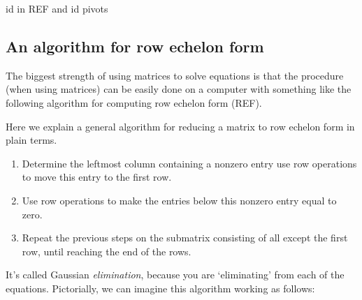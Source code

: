 \documentclass{ximera}
\begin{document}
\begin{question}
  id in REF and id pivots
\end{question}



\subsection{An algorithm for row echelon form}

The biggest strength of using matrices to solve equations is that the
procedure (when using matrices) can be easily done on a computer with
something like the following algorithm for computing row echelon form
(REF).

\begin{algorithm}
  Here we explain a general algorithm for reducing a matrix to row
  echelon form in plain terms.
  \begin{enumerate}
  \item Determine the leftmost column containing a nonzero entry use
    row operations to move this entry to the first row.
  \item Use row operations to make the entries below this nonzero entry equal to zero.
  \item Repeat the previous steps on the submatrix consisting of all
    except the first row, until reaching the end of the rows.
  \end{enumerate}
\end{algorithm}

It's called Gaussian \textit{elimination}, because you are
`eliminating' from each of the equations.  Pictorially, we can imagine
this algorithm working as follows:
\end{document}
